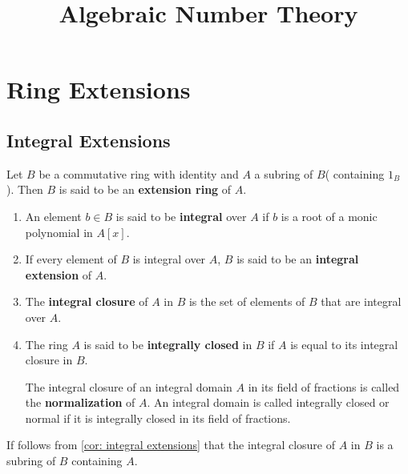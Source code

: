 \documentclass[12pt, oneside]{book}
\begin{document}
\frontmatter
\title{{\Huge{\textbf{Algebraic Number Theory}}}}
\maketitle
{}
\tableofcontents %


\mainmatter
{} %



\chapter{Ring Extensions} %
\section{Integral Extensions} %
\begin{definition}
    Let $B$ be a commutative ring with identity and $A$ a subring of $B$( containing $1_B$ ). Then $B$ is said to be an \textbf{extension ring} of $A$.
    \begin{enumerate}
        \item
              An element $b\in B$ is said to be \textbf{integral} over $A$ if
              $b$ is a root of  a monic polynomial in $A[x]$.
        \item
              If every element of $B$ is integral over $A$, $B$ is said to be an \textbf{integral extension} of $A$.
        \item
              The \textbf{integral closure} of $A$ in $B$ is the set of elements of $B$ that are integral over $A$.
        \item
              The ring $A$ is said to be \textbf{integrally closed} in $B$ if $A$ is equal to its integral closure in $B$.

              The integral closure of an integral domain $A$ in its field of fractions is called the \textbf{normalization} of $A$. An integral domain is called integrally closed or normal if it is integrally closed in its field of fractions.
    \end{enumerate}
    \begin{remark}
        If follows from \cref{cor: integral extensions} that the integral closure of $A$ in $B$ is a subring of $B$ containing $A$.
    \end{remark}
\end{definition}
\end{document}
